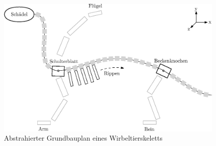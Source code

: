 \documentclass{beamer}
\begin{document}
\begin{frame}[plain]
 \begin{figure}
  \centering
  \includegraphics[width=\textwidth]{../graphics/skeletonPlan}
  \caption{Abstrahierter Grundbauplan eines Wirbeltierskeletts}
 \end{figure}
\end{frame}

\end{document}
